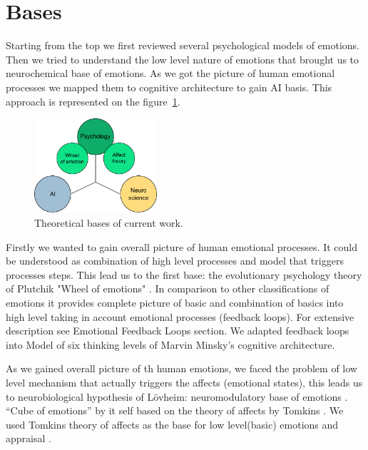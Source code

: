 \section{Bases}

Starting from the top we first reviewed several psychological models of emotions. Then we tried to understand the low level nature of emotions that brought us to neurochemical base of emotions. As we got the picture of human emotional processes we mapped them to cognitive architecture to gain AI basis. This approach is represented on the figure~\ref{3_bases}.

\begin{figure}
\begin{center}
 \includegraphics[height=3.5cm]{figure1_3_bases}
\end{center}
\caption{Theoretical bases of current work.}
\label{3_bases}
\end{figure}

Firstly we wanted to gain overall picture of human emotional processes. It could be understood as combination of high level processes and model that triggers processes steps. This lead us to the first base: the evolutionary psychology theory of Plutchik "Wheel of emotions" \cite{natureofemotions}. In comparison to other classifications of emotions it provides complete picture of basic and combination of basics into high level taking in account emotional processes (feedback loops). For extensive description see Emotional Feedback Loops section. We adapted feedback loops into Model of six \cite{emotionmachine} thinking levels of Marvin Minsky's cognitive architecture.

As we gained overall picture of th human emotions, we faced the problem of low level mechanism that actually triggers the affects (emotional states), this leads us to neurobiological hypothesis of L\"{o}vheim: neuromodulatory base of emotions \cite{cubeofemotions}. ``Cube of emotions'' by it self based on the theory of affects by Tomkins \cite{primer_affect_psychology, tomkins1, tomkins2, tomkins3}. We used Tomkins theory of affects as the base for low level(basic) emotions and appraisal \cite{primer_affect_psychology, appraisal_considered_as_a_process, appraisal_determinants_of_emotions, putting_appraisal_in_context}.

